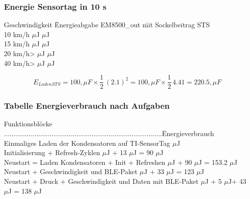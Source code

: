 \subsubsection*{Energie Sensortag in 10 s}
\begin{tabbing}
    Geschwindigkeit \quad\= Energieabgabe EM8500\_out  \quad\= mit Sockelbeitrag STS\\[0.8ex]
    10 km/h         $\mu$J          $\mu$J\\
    15 km/h        $\mu$J          $\mu$J\\
    20 km/h>       $\mu$J          $\mu$J\\
    40 km/h>      $\mu$J         $\mu$J\\
\end{tabbing}  

\begin{equation}
  E_{Laden STS}= 100, \mu F \times \frac{1}{2}\, (2.1)^2 = 100, \mu F \times \frac{1}{2}\, 4.41 = 220.5, \mu F
\end{equation}


\subsubsection*{Tabelle Energieverbrauch nach Aufgaben}
\begin{tabbing}
    Funktionsblöcke ...................................................................................\quad\= Energieverbrauch \\[0.8ex]
    Einmaliges Laden der Kondensatoren auf TI-SensorTag         $\mu$J\\
    Initialisierung + Refresh-Zyklen                            $\mu$J + 13 $\mu$J = 90 $\mu$J\\
    Neustart = Laden Kondensatoren + Init + Refreshen           $\mu$J + 90 $\mu$J = 153.2 $\mu$J\\
    Neustart + Geschwindigkeit und BLE-Paket                    $\mu$J + 33 $\mu$J = 123 $\mu$J\\
    Neustart + Druck + Geschwindigkeit und Daten mit BLE-Paket  $\mu$J + 5 $\mu$J+ 43 $\mu$J = 138 $\mu$J\\
\end{tabbing} 



